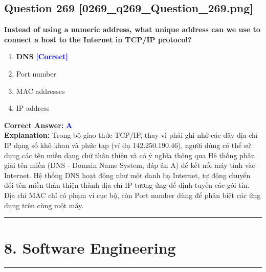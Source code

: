 \documentclass[11pt,a4paper]{article}
\begin{document}
\begin{minipage}{\textwidth}
\subsection*{Question 269 \quad \footnotesize{[0269\_q269\_Question\_269.png]}}
\noindent \textbf{Instead of using a numeric address, what unique address can we use to connect a host to the Internet in TCP/IP protocol?}

\begin{enumerate}[label=\Alph*.]
    \item \textbf{DNS} \hfill \textcolor{blue}{\textbf{[Correct]}}
    \item Port number
    \item MAC addresses
    \item IP address
\end{enumerate}

\noindent \textbf{Correct Answer:} \textcolor{blue}{\textbf{A}} \\[2pt]
\noindent \textbf{Explanation:} Trong bộ giao thức TCP/IP, thay vì phải ghi nhớ các dãy địa chỉ IP dạng số khô khan và phức tạp (ví dụ 142.250.190.46), người dùng có thể sử dụng các tên miền dạng chữ thân thiện và có ý nghĩa thông qua Hệ thống phân giải tên miền (DNS - Domain Name System, đáp án A) để kết nối máy tính vào Internet. Hệ thống DNS hoạt động như một danh bạ Internet, tự động chuyển đổi tên miền thân thiện thành địa chỉ IP tương ứng để định tuyến các gói tin. Địa chỉ MAC chỉ có phạm vi cục bộ, còn Port number dùng để phân biệt các ứng dụng trên cùng một máy.

\par\vspace{0.3cm}
\hrule
\vspace{0.3cm}
\end{minipage}


\newpage
\section*{8. Software Engineering}
\hrule\vspace{0.5cm}
\end{document}
